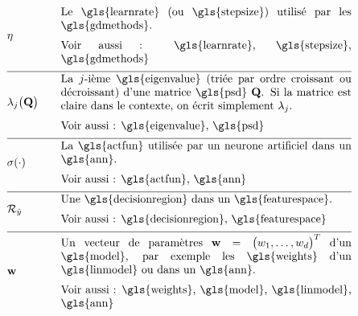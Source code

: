 \begin{align}
	& \lrate & \quad & \parbox{.75\textwidth}{
		Le \gls{learnrate} (ou \gls{stepsize}) utilisé par les \gls{gdmethods}. \\
		[2mm] Voir aussi : \gls{learnrate}, \gls{stepsize}, \gls{gdmethods}
	} \nonumber \\[2mm] \hline \nonumber\\[-5mm]
	& \eigval{\featureidx}\big( \mathbf{Q} \big) & \quad & \parbox{.75\textwidth}{
		La $\featureidx$-ième \gls{eigenvalue} (triée par ordre croissant ou décroissant) d’une matrice \gls{psd} $\mathbf{Q}$. Si la matrice est claire dans le contexte, on écrit simplement $\eigval{\featureidx}$. \\
		[2mm] Voir aussi : \gls{eigenvalue}, \gls{psd}
	} \nonumber \\[2mm] \hline \nonumber\\[-5mm]
	& \actfun(\cdot) & \quad & \parbox{.75\textwidth}{
		La \gls{actfun} utilisée par un neurone artificiel dans un \gls{ann}. \\
		[2mm] Voir aussi : \gls{actfun}, \gls{ann}
	} \nonumber \\[2mm] \hline \nonumber\\[-5mm]
	& \decreg{\hat{\truelabel}} & \quad & \parbox{.75\textwidth}{
		Une \gls{decisionregion} dans un \gls{featurespace}. \\
		[2mm] Voir aussi : \gls{decisionregion}, \gls{featurespace}
	} \nonumber \\[2mm] \hline \nonumber\\[-5mm]
	& \weights & \quad & \parbox{.75\textwidth}{
		Un vecteur de paramètres $\weights = \big(\weight_{1},\ldots,\weight_{\featuredim}\big)^{T}$ d’un \gls{model}, par exemple les \gls{weights} d’un \gls{linmodel} ou dans un \gls{ann}. \\
		[2mm] Voir aussi : \gls{weights}, \gls{model}, \gls{linmodel}, \gls{ann}
	} \nonumber
\end{align}

